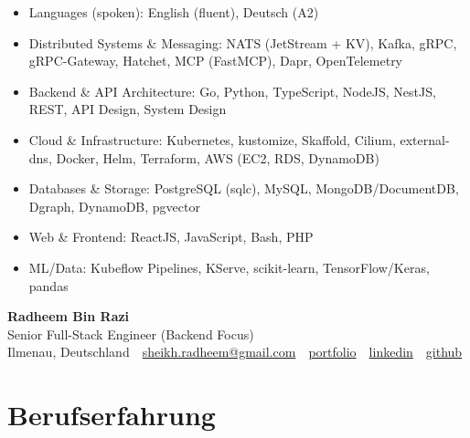 \documentclass[10pt,a4paper]{resume}
\makeatletter
\newcommand{\Portfolio}{https://radheem.github.io/my-cv}
\newcommand{\PortfolioText}{portfolio}
\newcommand{\GitHub}{https://github.com/radheem}
\newcommand{\LinkedIn}{https://www.linkedin.com/in/radheem-razi}
\newcommand{\Email}{sheikh.radheem@gmail.com}
\makeatother
\begin{document}
\begin{itemize}[leftmargin=1.4em,nosep,topsep=2pt]
  \item Languages (spoken): English (fluent), Deutsch (A2)
  \item Distributed Systems \& Messaging: NATS (JetStream + KV), Kafka, gRPC, gRPC-Gateway, Hatchet, MCP (FastMCP), Dapr, OpenTelemetry
  \item Backend \& API Architecture: Go, Python, TypeScript, NodeJS, NestJS, REST, API Design, System Design
  \item Cloud \& Infrastructure: Kubernetes, kustomize, Skaffold, Cilium, external-dns, Docker, Helm, Terraform, AWS (EC2, RDS, DynamoDB)
  \item Databases \& Storage: PostgreSQL (sqlc), MySQL, MongoDB/DocumentDB, Dgraph, DynamoDB, pgvector
  \item Web \& Frontend: ReactJS, JavaScript, Bash, PHP
  \item ML/Data: Kubeflow Pipelines, KServe, scikit-learn, TensorFlow/Keras, pandas
\end{itemize}

\clearpage
{}

\begin{center}
  {\huge\bfseries Radheem Bin Razi}\\[3pt]
  {\large Senior Full-Stack Engineer (Backend Focus)}\\[6pt]
  \small
  Ilmenau, Deutschland \,\textbar\,
  \href{mailto:\Email}{\Email} \,\textbar\,
  \href{\Portfolio}{\PortfolioText} \,\textbar\,
  \href{\LinkedIn}{linkedin} \,\textbar\,
  \href{\GitHub}{github}
\end{center}
\vspace{2pt}

\section{Berufserfahrung}
\end{document}
